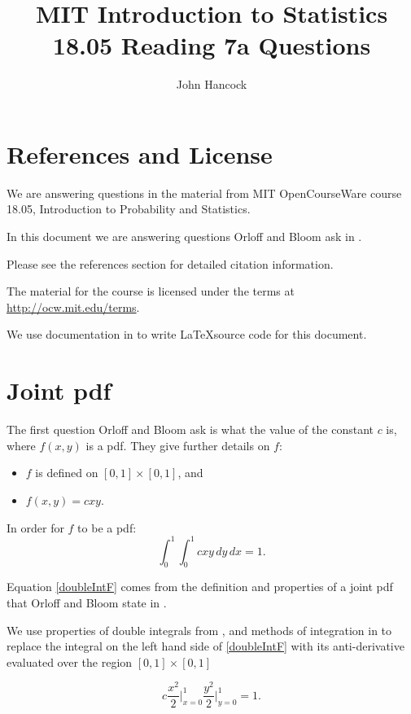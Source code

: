 \documentclass[a4paper,11pt]{article}
\author{John Hancock}
\title{MIT Introduction to Statistics 18.05 Reading 7a Questions}
\begin{document}
\maketitle
\tableofcontents
\section{References and License}
We are answering questions in the material from MIT OpenCourseWare
course 18.05, Introduction to Probability and Statistics.

In this document we are answering questions Orloff and Bloom ask in
\cite{reading7qu}.

Please see the references section for detailed citation information.

The material for the course is licensed under the terms at
\url{http://ocw.mit.edu/terms}.

We use documentation in  to write \LaTeX source code for this
document.

\section{Joint pdf}
The first question Orloff and Bloom ask is what the value of the constant
$c$ is, where $f\left(x, y\right)$ is a pdf.  They give further details
on $f$:
\begin{itemize}
  \item $f$ is defined on $\left[0,1 \right] \times \left[0, 1 \right]$, and
  \item $f \left( x, y \right) = cxy$.
\end{itemize}

In order for $f$ to be a pdf:
\begin{equation}\label{doubleIntF}
  \int_{0}^{1} \int_{0}^{1} cxy \, dy \, dx = 1.
\end{equation}

Equation \ref{doubleIntF} comes from the definition and properties
of a joint pdf that Orloff and Bloom state in \cite{reading7}.

We use properties of double integrals from \cite{doubleIntProp}, and
methods of integration in \cite{doubleIntEval} to replace the
integral on the left hand side of \ref{doubleIntF} with its
anti-derivative evaluated over the region
$\left[ 0, 1 \right] \times \left[ 0, 1 \right]$

\begin{equation}\label{antiDerF}
  c \frac{x^2}{2} \bigg\rvert_{x=0}^1 \frac{y^2}{2} \bigg\rvert_{y=0}^1 = 1.
\end{equation}
\end{document}
